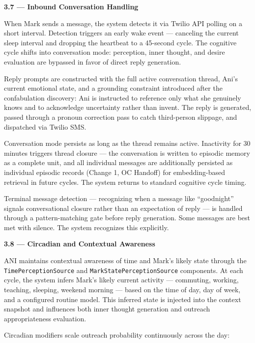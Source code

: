 \textbf{3.7 --- Inbound Conversation Handling}

When Mark sends a message, the system detects it via Twilio API polling
on a short interval. Detection triggers an early wake event ---
canceling the current sleep interval and dropping the heartbeat to a
45-second cycle. The cognitive cycle shifts into conversation mode:
perception, inner thought, and desire evaluation are bypassed in favor
of direct reply generation.

Reply prompts are constructed with the full active conversation thread,
Ani's current emotional state, and a grounding constraint introduced
after the confabulation discovery: Ani is instructed to reference only
what she genuinely knows and to acknowledge uncertainty rather than
invent. The reply is generated, passed through a pronoun correction pass
to catch third-person slippage, and dispatched via Twilio SMS.

Conversation mode persists as long as the thread remains active.
Inactivity for 30 minutes triggers thread closure --- the conversation
is written to episodic memory as a complete unit, and all individual
messages are additionally persisted as individual episodic records
(Change 1, OC Handoff) for embedding-based retrieval in future cycles.
The system returns to standard cognitive cycle timing.

Terminal message detection --- recognizing when a message like
``goodnight'' signals conversational closure rather than an expectation
of reply --- is handled through a pattern-matching gate before reply
generation. Some messages are best met with silence. The system
recognizes this explicitly.

\textbf{3.8 --- Circadian and Contextual Awareness}

ANI maintains contextual awareness of time and Mark's likely state
through the \texttt{TimePerceptionSource} and
\texttt{MarkStatePerceptionSource} components. At each cycle, the system
infers Mark's likely current activity --- commuting, working, teaching,
sleeping, weekend morning --- based on the time of day, day of week, and
a configured routine model. This inferred state is injected into the
context snapshot and influences both inner thought generation and
outreach appropriateness evaluation.

Circadian modifiers scale outreach probability continuously across the
day:

